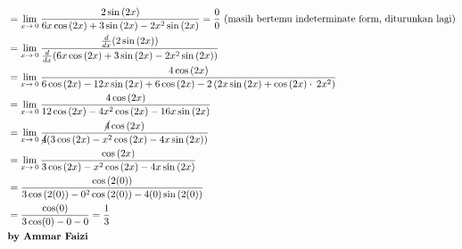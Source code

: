 \documentclass[12pt]{article}
\begin{document}
\begin{fleqn}[1em]
\begin{align*}
{\begin{aligned}
  & = \lim _{x\to \:0} \frac{2\sin \left(2x\right)}{6x\cos \left(2x\right)+3\sin \left(2x\right)-2x^2\sin \left(2x\right)} = \frac{0}{0} \text{ (masih bertemu indeterminate form, diturunkan lagi)} \\
  & = \lim _{x\to \:0} \frac{\frac{d}{dx}(2\sin \left(2x\right))}{\frac{d}{dx}(6x\cos \left(2x\right)+3\sin \left(2x\right)-2x^2\sin \left(2x\right))} \\
  & = \lim _{x\to \:0} \frac{4\cos \left(2x\right)}{6\cos \left(2x\right)-12x\sin \left(2x\right)+6\cos \left(2x\right)-2\left(2x\sin \left(2x\right)+\cos \left(2x\right)\cdot \:2x^2\right)} \\
  & = \lim _{x\to \:0} \frac{4\cos \left(2x\right)}{12\cos \left(2x\right)-4x^2\cos \left(2x\right)-16x\sin \left(2x\right)} \\
  & = \lim _{x\to \:0} \frac{\cancel{4}\cos \left(2x\right)}{\cancel{4}(3\cos \left(2x\right)-x^2\cos \left(2x\right)-4x\sin \left(2x\right))} \\
  & = \lim _{x\to \:0}\frac{\cos \left(2x\right)}{3\cos \left(2x\right)-x^2\cos \left(2x\right)-4x\sin \left(2x\right)} \\
  & = \frac{\cos \left(2(0)\right)}{3\cos \left(2(0)\right)-0^2\cos \left(2(0)\right)-4(0)\sin \left(2(0)\right)} \\
  & = \frac{\cos(0)}{3\cos(0) - 0 - 0} = \frac{1}{3}
  \\ & \textbf{by Ammar Faizi}
\end{aligned}
}
\end{align*}


\end{fleqn}
\end{document}
